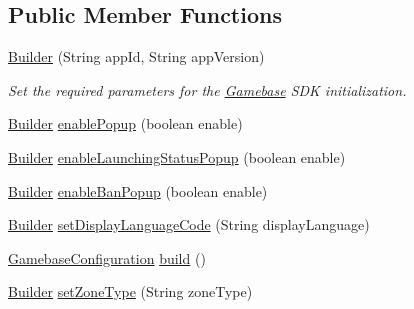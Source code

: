 \subsection*{Public Member Functions}
\begin{DoxyCompactItemize}
\item 
\hyperlink{classcom_1_1toast_1_1android_1_1gamebase_1_1_gamebase_configuration_1_1_builder_afbe6729f6423577d9a06c1832315f37d}{Builder} (String app\+Id, String app\+Version)
\begin{DoxyCompactList}\small\item\em Set the required parameters for the \hyperlink{classcom_1_1toast_1_1android_1_1gamebase_1_1_gamebase}{Gamebase} S\+DK initialization. \end{DoxyCompactList}\item 
\hyperlink{classcom_1_1toast_1_1android_1_1gamebase_1_1_gamebase_configuration_1_1_builder}{Builder} \hyperlink{classcom_1_1toast_1_1android_1_1gamebase_1_1_gamebase_configuration_1_1_builder_a5b53589024bfbfc126c7f621ee0c2722}{enable\+Popup} (boolean enable)
\item 
\hyperlink{classcom_1_1toast_1_1android_1_1gamebase_1_1_gamebase_configuration_1_1_builder}{Builder} \hyperlink{classcom_1_1toast_1_1android_1_1gamebase_1_1_gamebase_configuration_1_1_builder_a1012d5b14ba4676c15432cc45fd26488}{enable\+Launching\+Status\+Popup} (boolean enable)
\item 
\hyperlink{classcom_1_1toast_1_1android_1_1gamebase_1_1_gamebase_configuration_1_1_builder}{Builder} \hyperlink{classcom_1_1toast_1_1android_1_1gamebase_1_1_gamebase_configuration_1_1_builder_a92e099b86ad7acbabec3c0c4b7bda36e}{enable\+Ban\+Popup} (boolean enable)
\item 
\hyperlink{classcom_1_1toast_1_1android_1_1gamebase_1_1_gamebase_configuration_1_1_builder}{Builder} \hyperlink{classcom_1_1toast_1_1android_1_1gamebase_1_1_gamebase_configuration_1_1_builder_a03014f0267bce586f24ebe8478982ed3}{set\+Display\+Language\+Code} (String display\+Language)
\item 
\hyperlink{classcom_1_1toast_1_1android_1_1gamebase_1_1_gamebase_configuration}{Gamebase\+Configuration} \hyperlink{classcom_1_1toast_1_1android_1_1gamebase_1_1_gamebase_configuration_1_1_builder_aa7918a81c9a0e2a68b4aeb901e5352b2}{build} ()
\item 
\hyperlink{classcom_1_1toast_1_1android_1_1gamebase_1_1_gamebase_configuration_1_1_builder}{Builder} \hyperlink{classcom_1_1toast_1_1android_1_1gamebase_1_1_gamebase_configuration_1_1_builder_a66db0aa4dc8c164fd7d93cd20e0af13e}{set\+Zone\+Type} (String zone\+Type)

\end{DoxyCompactItemize}
